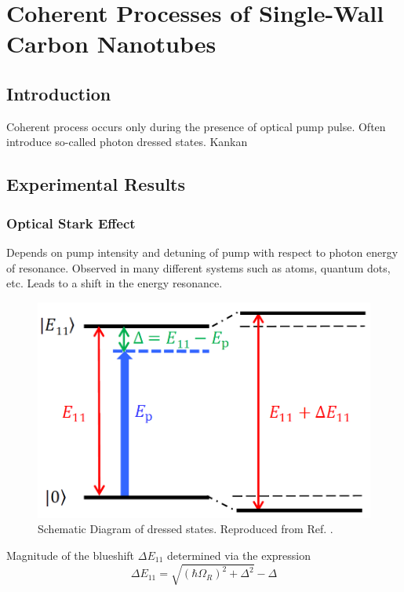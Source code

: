 \chapter{Coherent Processes of Single-Wall Carbon Nanotubes}

\section{Introduction}
Coherent process occurs only during the presence of optical pump pulse. Often introduce so-called photon dressed states. 
Kankan \cite{cong2018}

\section{Experimental Results}
	
\subsection{Optical Stark Effect}

Depends on pump intensity and detuning of pump with respect to photon energy of resonance. Observed in many different systems such as atoms, quantum dots, etc. Leads to a shift in the energy resonance. 
\begin{figure}[H]
	\centering
	\includegraphics[scale=0.5]{images/chapter_coherent/kankan_stark_effect.png}
	\caption{Schematic Diagram of dressed states. Reproduced from Ref. \cite{cong2018}.}
\end{figure}

Magnitude of the blueshift $\Delta E_{11}$ determined via the expression
\begin{equation}
		\Delta E_{11} = \sqrt{(\hbar \Omega_R)^2 + \Delta^2} - \Delta
\end{equation}

